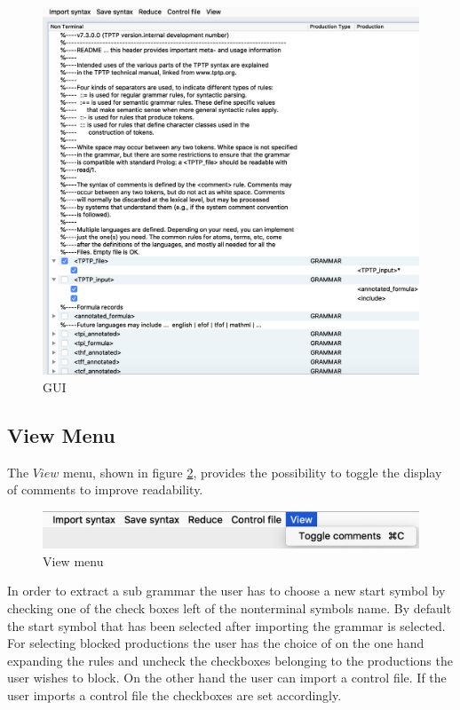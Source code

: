 \begin{figure}[H]
\centering
\includegraphics[width=1\textwidth]{images/gui.png}
\caption{GUI}
\label{fig:gui}
\end{figure}

\subsection{View Menu}\label{sec:ConceptGUIViewMenu}

The $View$ menu, shown in figure \ref{fig:view}, provides the possibility to toggle the display of comments to improve readability.

\begin{figure}[H]
\centering
\includegraphics[width=.7\textwidth]{images/view.png}
\caption{View menu}
\label{fig:view}
\end{figure}

In order to extract a sub grammar the user has to choose a new start symbol by checking one of the check boxes left of the nonterminal symbols name. By default the start symbol that has been selected after importing the grammar is selected. For selecting blocked productions the user has the choice of on the one hand expanding the rules and uncheck the checkboxes belonging to the productions the user wishes to block. On the other hand the user can import a control file. If the user imports a control file the checkboxes are set accordingly.

